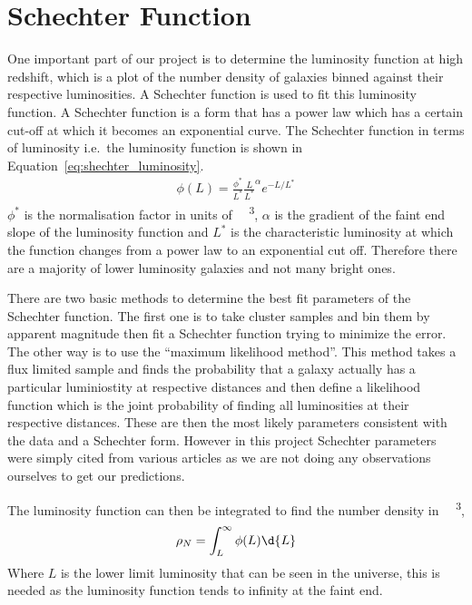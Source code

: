 
\section{Schechter Function} %
\label{sec:schechter_function}
	One important part of our project is to determine the luminosity function at high redshift, which is a plot of the number density of galaxies binned against their respective luminosities. A Schechter function is used to fit this luminosity function. A Schechter function is a form that has a power law which has a certain cut-off at which it becomes an exponential curve. The Schechter function in terms of luminosity i.e.\ the luminosity function is shown in Equation~\ref{eq:shechter_luminosity}\cite{cosmo_number_densities}.
	\begin{align}
		\phi(L)=\frac{\phi^{*}}{L^{*}}\frac{L}{L^{*}}^{\alpha}e^{-L/L^{*}} \label{eq:shechter_luminosity}
	\end{align}
	$\phi^{*}$ is the normalisation factor in units of \si{\per\mega\parsec\cubed}, $\alpha$ is the gradient of the faint end slope of the luminosity function and $L^{*}$ is the characteristic luminosity at which the function changes from a power law to an exponential cut off. Therefore there are a majority of lower luminosity galaxies and not many bright ones.

	There are two basic methods to determine the best fit parameters of the Schechter function\cite{luminosity_functions_online}. The first one is to take cluster samples and bin them by apparent magnitude then fit a Schechter function trying to minimize the error. The other way is to use the ``maximum likelihood method''. This method takes a flux limited sample and finds the probability that a galaxy actually has a particular luminiostity at respective distances and then define a likelihood function which is the joint probability of finding all luminosities at their respective distances. These are then the most likely parameters consistent with the data and a Schechter form. However in this project Schechter parameters were simply cited from various articles as we are not doing any observations ourselves to get our predictions.

	The luminosity function can then be integrated to find the number density in \si{\per\mega\parsec\cubed},
	\begin{align}
		\rho_{N}=\int^{\infty}_{L}\phi(L)\d{L}
	\end{align}
	Where $L$ is the lower limit luminosity that can be seen in the universe, this is needed as the luminosity function tends to infinity at the faint end.

